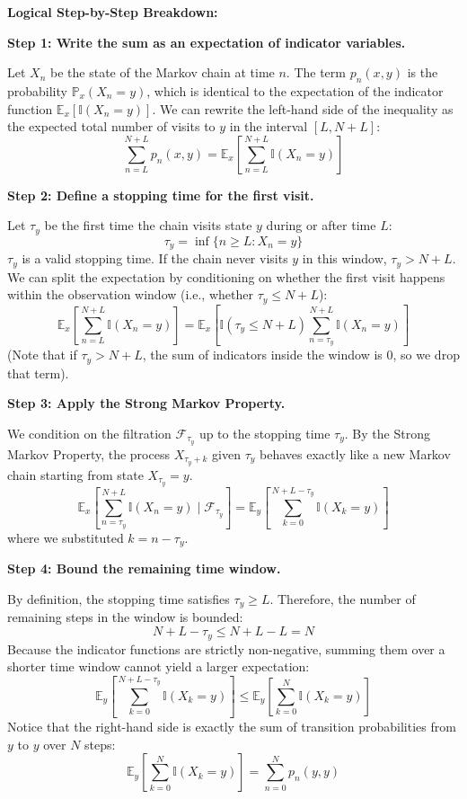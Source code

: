 \begin{solution}
\textbf{Logical Step-by-Step Breakdown:}

\textbf{Step 1: Write the sum as an expectation of indicator variables.}

Let $X_n$ be the state of the Markov chain at time $n$. The term $p_n(x,y)$ is the probability $\mathbb{P}_x(X_n = y)$, which is identical to the expectation of the indicator function $\mathbb{E}_x[\mathbb{I}(X_n = y)]$.
We can rewrite the left-hand side of the inequality as the expected total number of visits to $y$ in the interval $[L, N+L]$:
\[ \sum_{n=L}^{N+L} p_n(x,y) = \mathbb{E}_x \left[ \sum_{n=L}^{N+L} \mathbb{I}(X_n = y) \right] \]

\textbf{Step 2: Define a stopping time for the first visit.}

Let $\tau_y$ be the first time the chain visits state $y$ during or after time $L$:
\[ \tau_y = \inf\{n \geq L : X_n = y\} \]
$\tau_y$ is a valid stopping time. If the chain never visits $y$ in this window, $\tau_y > N+L$.
We can split the expectation by conditioning on whether the first visit happens within the observation window (i.e., whether $\tau_y \leq N+L$):
\[ \mathbb{E}_x \left[ \sum_{n=L}^{N+L} \mathbb{I}(X_n = y) \right] = \mathbb{E}_x \left[ \mathbb{I}(\tau_y \leq N+L) \sum_{n=\tau_y}^{N+L} \mathbb{I}(X_n = y) \right] \]
(Note that if $\tau_y > N+L$, the sum of indicators inside the window is 0, so we drop that term).

\textbf{Step 3: Apply the Strong Markov Property.}

We condition on the filtration $\mathcal{F}_{\tau_y}$ up to the stopping time $\tau_y$. By the Strong Markov Property, the process $X_{\tau_y + k}$ given $\tau_y$ behaves exactly like a new Markov chain starting from state $X_{\tau_y} = y$.
\[ \mathbb{E}_x \left[ \sum_{n=\tau_y}^{N+L} \mathbb{I}(X_n = y) \mid \mathcal{F}_{\tau_y} \right] = \mathbb{E}_y \left[ \sum_{k=0}^{N+L-\tau_y} \mathbb{I}(X_k = y) \right] \]
where we substituted $k = n - \tau_y$.

\textbf{Step 4: Bound the remaining time window.}

By definition, the stopping time satisfies $\tau_y \geq L$.
Therefore, the number of remaining steps in the window is bounded:
\[ N + L - \tau_y \leq N + L - L = N \]
Because the indicator functions are strictly non-negative, summing them over a shorter time window cannot yield a larger expectation:
\[ \mathbb{E}_y \left[ \sum_{k=0}^{N+L-\tau_y} \mathbb{I}(X_k = y) \right] \leq \mathbb{E}_y \left[ \sum_{k=0}^{N} \mathbb{I}(X_k = y) \right] \]
Notice that the right-hand side is exactly the sum of transition probabilities from $y$ to $y$ over $N$ steps:
\[ \mathbb{E}_y \left[ \sum_{k=0}^{N} \mathbb{I}(X_k = y) \right] = \sum_{n=0}^N p_n(y,y) \]


\end{solution}
